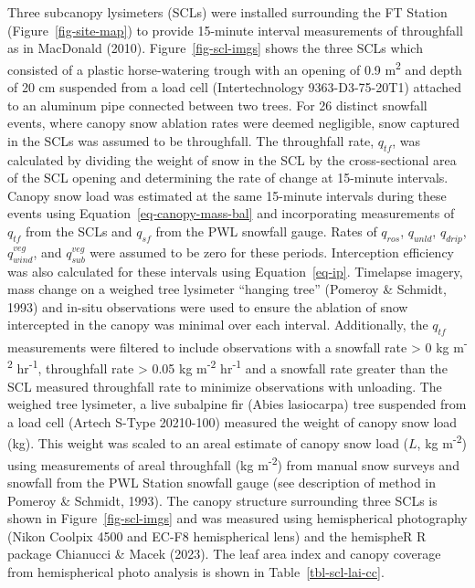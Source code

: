 \documentclass[
  letterpaper,
  DIV=11,
  numbers=noendperiod]{scrartcl}
\begin{document}
Three subcanopy lysimeters (SCLs) were installed surrounding the FT
Station (Figure~\ref{fig-site-map}) to provide 15-minute interval
measurements of throughfall as in MacDonald (2010).
Figure~\ref{fig-scl-imgs} shows the three SCLs which consisted of a
plastic horse-watering trough with an opening of 0.9
m\textsuperscript{2} and depth of 20 cm suspended from a load cell
(Intertechnology 9363-D3-75-20T1) attached to an aluminum pipe connected
between two trees. For 26 distinct snowfall events, where canopy snow
ablation rates were deemed negligible, snow captured in the SCLs was
assumed to be throughfall. The throughfall rate, \(q_{tf}\), was
calculated by dividing the weight of snow in the SCL by the
cross-sectional area of the SCL opening and determining the rate of
change at 15-minute intervals. Canopy snow load was estimated at the
same 15-minute intervals during these events using
Equation~\ref{eq-canopy-mass-bal} and incorporating measurements of
\(q_{tf}\) from the SCLs and \(q_{sf}\) from the PWL snowfall gauge.
Rates of \(q_{ros}\), \(q_{unld}\), \(q_{drip}\), \(q_{wind}^{veg}\),
and \(q_{sub}^{veg}\) were assumed to be zero for these periods.
Interception efficiency was also calculated for these intervals using
Equation~\ref{eq-ip}. Timelapse imagery, mass change on a weighed tree
lysimeter ``hanging tree'' (Pomeroy \& Schmidt, 1993) and in-situ
observations were used to ensure the ablation of snow intercepted in the
canopy was minimal over each interval. Additionally, the \(q_{tf}\)
measurements were filtered to include observations with a snowfall rate
\textgreater{} 0 kg m\textsuperscript{-2} hr\textsuperscript{-1},
throughfall rate \textgreater{} 0.05 kg m\textsuperscript{-2}
hr\textsuperscript{-1} and a snowfall rate greater than the SCL measured
throughfall rate to minimize observations with unloading. The weighed
tree lysimeter, a live subalpine fir (Abies lasiocarpa) tree suspended
from a load cell (Artech S-Type 20210-100) measured the weight of canopy
snow load (kg). This weight was scaled to an areal estimate of canopy
snow load (\(L\), kg m\textsuperscript{-2}) using measurements of areal
throughfall (kg m\textsuperscript{-2}) from manual snow surveys and
snowfall from the PWL Station snowfall gauge (see description of method
in Pomeroy \& Schmidt, 1993). The canopy structure surrounding three
SCLs is shown in Figure~\ref{fig-scl-imgs} and was measured using
hemispherical photography (Nikon Coolpix 4500 and EC-F8 hemispherical
lens) and the hemispheR R package Chianucci \& Macek (2023). The leaf
area index and canopy coverage from hemispherical photo analysis is
shown in Table~\ref{tbl-scl-lai-cc}.
\end{document}
